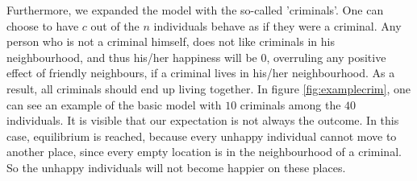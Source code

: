Furthermore, we expanded the model with the so-called 'criminals'.
One can choose to have $c$ out of the $n$ individuals behave as if they were a criminal.
Any person who is not a criminal himself, does not like criminals in his neighbourhood, and thus his/her happiness will be $0$, overruling any positive effect of friendly neighbours, if a criminal lives in his/her neighbourhood.
As a result, all criminals should end up living together.
In figure \ref{fig:examplecrim}, one can see an example of the basic model with $10$ criminals among the $40$ individuals.
It is visible that our expectation is not always the outcome.
In this case, equilibrium is reached, because every unhappy individual cannot move to another place, since every empty location is in the neighbourhood of a criminal.
So the unhappy individuals will not become happier on these places.

